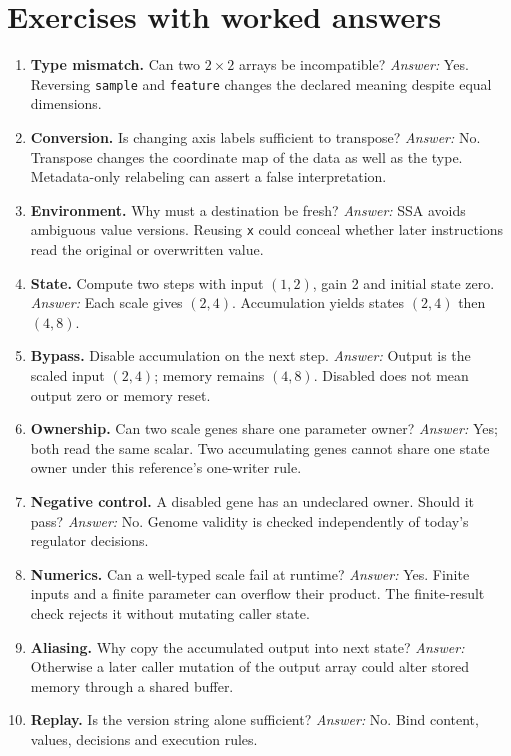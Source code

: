 \section{Exercises with worked answers}
\begin{enumerate}
\item \textbf{Type mismatch.} Can two $2\times2$ arrays be incompatible?
\textit{Answer:} Yes. Reversing \texttt{sample} and \texttt{feature} changes
the declared meaning despite equal dimensions.
\item \textbf{Conversion.} Is changing axis labels sufficient to transpose?
\textit{Answer:} No. Transpose changes the coordinate map of the data as
well as the type. Metadata-only relabeling can assert a false interpretation.
\item \textbf{Environment.} Why must a destination be fresh?
\textit{Answer:} SSA avoids ambiguous value versions. Reusing \texttt{x}
could conceal whether later instructions read the original or overwritten value.
\item \textbf{State.} Compute two steps with input $(1,2)$, gain 2 and
initial state zero. \textit{Answer:} Each scale gives $(2,4)$.
Accumulation yields states $(2,4)$ then $(4,8)$.
\item \textbf{Bypass.} Disable accumulation on the next step.
\textit{Answer:} Output is the scaled input $(2,4)$; memory remains $(4,8)$.
Disabled does not mean output zero or memory reset.
\item \textbf{Ownership.} Can two scale genes share one parameter owner?
\textit{Answer:} Yes; both read the same scalar. Two accumulating genes
cannot share one state owner under this reference's one-writer rule.
\item \textbf{Negative control.} A disabled gene has an undeclared owner.
Should it pass? \textit{Answer:} No. Genome validity is checked independently
of today's regulator decisions.
\item \textbf{Numerics.} Can a well-typed scale fail at runtime?
\textit{Answer:} Yes. Finite inputs and a finite parameter can overflow
their product. The finite-result check rejects it without mutating caller state.
\item \textbf{Aliasing.} Why copy the accumulated output into next state?
\textit{Answer:} Otherwise a later caller mutation of the output array could
alter stored memory through a shared buffer.
\item \textbf{Replay.} Is the version string alone sufficient?
\textit{Answer:} No. Bind content, values, decisions and execution rules.

\end{enumerate}
